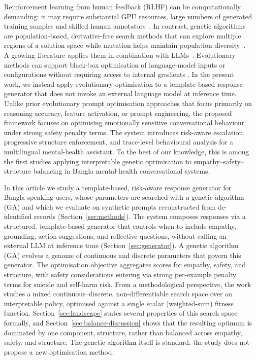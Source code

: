 \documentclass[mathematics,article,submit,xetex,moreauthors]{Definitions/mdpi}
\begin{document}
Reinforcement learning from human feedback (RLHF) can be computationally demanding: it may require substantial GPU resources, large numbers of generated training samples and skilled 
human annotators~\cite{WongTan2024}. In contrast, genetic algorithms are population-based, derivative-free search
methods that can explore multiple regions of a solution space while mutation
helps maintain population diversity~\cite{Nath2026}. A growing literature
applies them in combination with
LLMs~\cite{mles2026,gendl2025}. Evolutionary methods can support black-box optimisation of language-model
inputs or configurations without requiring access to internal gradients
\cite{when_llms_meet_ea2025}. In the present work, we instead apply
evolutionary optimisation to a template-based response generator that does
not invoke an external language model at inference time.
Unlike prior evolutionary prompt optimisation approaches that focus primarily on
reasoning accuracy, feature activation, or prompt engineering, the proposed
framework focuses on optimising emotionally sensitive conversational behaviour
under strong safety penalty terms. The system introduces risk-aware escalation,
progressive structure enforcement, and trace-level behavioural analysis for a
multilingual mental-health assistant. To the best of our knowledge, this is
among the first studies applying interpretable genetic optimisation to
empathy--safety--structure balancing in Bangla mental-health conversational
systems.

In this article we study a template-based, risk-aware response generator for
Bangla-speaking users, whose parameters are searched with a genetic algorithm
(GA) and which we evaluate on synthetic prompts reconstructed from
de-identified records (Section~\ref{sec:methods}). The system composes responses via a structured, template-based
generator that controls when to include empathy, grounding, action
suggestions, and reflective questions, without calling an external LLM at
inference time (Section~\ref{sec:generator}). A genetic algorithm (GA) evolves
a genome of continuous and discrete parameters that govern this generator. The
optimisation objective aggregates scores for empathy, safety, and structure,
with safety considerations entering via strong per-example penalty terms for
suicide and self-harm risk. From a methodological perspective, the work studies a mixed
continuous--discrete, non-differentiable search space over an interpretable
policy, optimised against a single scalar (weighted-sum) fitness function.
Section~\ref{sec:landscape} states several properties of this search space
formally, and Section~\ref{sec:balance-discussion} shows that the resulting
optimum is dominated by one component, structure, rather than balanced across
empathy, safety, and structure. The genetic algorithm itself is standard; the
study does not propose a new optimisation method.
\end{document}
